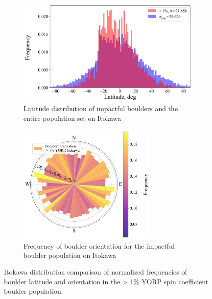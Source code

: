 \begin{figure}[t]
    \centering
    \begin{subfigure}[t]{0.48\textwidth}
        \centering
        \includegraphics[width=\textwidth]{fig/itokawa_impact_location_new.png}
        \caption{Latitude distribution of impactful boulders and the entire population set on Itokawa}
        \label{fig:ito_latitudes}
    \end{subfigure}
    \hfill
    \begin{subfigure}[t]{0.49\textwidth}
        \centering
        \includegraphics[width=0.75\textwidth]{fig/itokawa_impact_orient_new.png}
        \caption{Frequency of boulder orientation for the impactful boulder population on Itokawa}
        \label{fig:ito_orientation}
    \end{subfigure}
    \caption{Itokawa distribution comparison of normalized frequencies of boulder latitude and orientation in the > 1\% YORP spin coefficient boulder population.}
    \label{fig:itokawa_results}
\end{figure}
